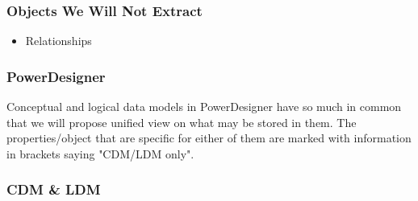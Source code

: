 \begin{itemize}
	\subsubsection{Objects We Will Not Extract}
	\begin{itemize}
		\item Relationships
	\end{itemize}
\end{itemize}


\subsubsection{PowerDesigner}

Conceptual and logical data models in PowerDesigner have so much in common that we will propose unified view on what may be stored in them. The properties/object that are specific for either of them are marked with information in brackets saying "CDM/LDM only".

\subsubsection{CDM \& LDM}

